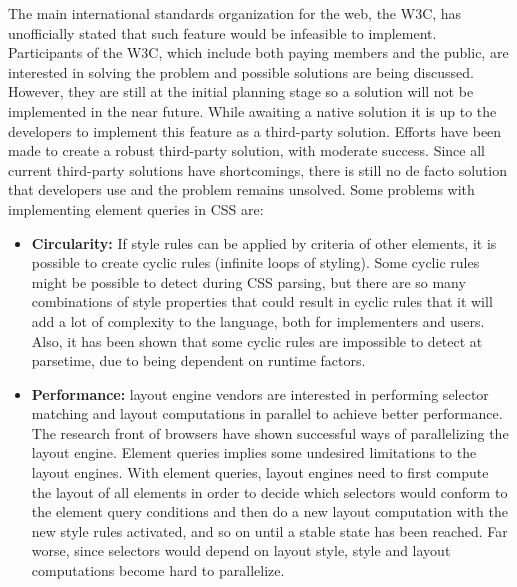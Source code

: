 \documentclass[a4paper,11pt]{kth-mag}
\begin{document}
      The main international standards organization for the \gls{web}, the \gls{W3C}, has unofficially stated that such feature would be infeasible to implement.
      Participants of the \gls{W3C}, which include both paying members and the public, are interested in solving the problem and possible solutions are being discussed.
      However, they are still at the initial planning stage so a solution will not be implemented  in the near future.
      While awaiting a \gls{native} solution it is up to the developers to implement this feature as a \gls{third-party} solution.
      Efforts have been made to create a robust \gls{third-party} solution, with moderate success.
      Since all current \gls{third-party} solutions have shortcomings, there is still no de facto solution that developers use and the problem remains unsolved.
      Some problems with implementing element queries  in \gls{CSS} are:
      \begin{itemize}
        \item \textbf{Circularity:}
        If style rules can be applied by criteria of other \glspl{element}, it is possible to create cyclic rules (infinite loops of styling).
        Some cyclic rules might be possible to detect during \gls{CSS} parsing, but there are so many combinations of style properties that could result in cyclic rules that it will add a lot of complexity to the language, both for implementers and users.
        Also, it has been shown that some cyclic rules are impossible to detect at parsetime, due to being dependent on runtime factors.
        \item \textbf{Performance:} 
        \Gls{layout engine} vendors are interested in performing selector matching and layout computations in parallel to achieve better performance.
        The research front of \glspl{browser} have shown successful ways of parallelizing the \gls{layout engine}.
        Element queries implies some undesired limitations to the \glspl{layout engine}.
        With element queries, \glspl{layout engine} need to first compute the layout of all \glspl{element} in order to decide which selectors would conform to the element query conditions and then do a new layout computation with the new style rules activated, and so on until a stable state has been reached.
        Far worse, since selectors would depend on layout style, style and layout computations become hard to parallelize.
      \end{itemize}
\end{document}
